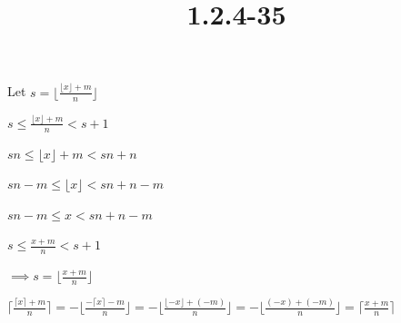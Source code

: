 \documentclass{article}
\title{1.2.4-35}
\begin{document}
\maketitle

Let \( s = \lfloor \frac{\lfloor x \rfloor +m}{n} \rfloor \)

\( s \leq \frac{\lfloor x \rfloor +m}{n} < s + 1 \)

\( sn \leq \lfloor x \rfloor + m < sn+n \)

\( sn - m \leq \lfloor x \rfloor < sn + n - m \)

\( sn - m \leq x < sn + n - m \)

\( s \leq \frac{x+m}{n} < s + 1 \)

\( \implies s = \lfloor \frac{x+m}{n} \rfloor \)

\( \lceil \frac{\lceil x \rceil + m}{n} \rceil = -\lfloor \frac{-\lceil x \rceil - m}{n} \rfloor = -\lfloor \frac{\lfloor -x \rfloor + (- m)}{n} \rfloor = -\lfloor \frac{(-x) + (- m)}{n} \rfloor = \lceil \frac{x + m}{n} \rceil \)
\end{document}
